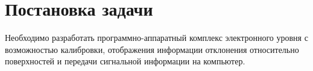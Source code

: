 \documentclass[document.tex]{subfiles}
\begin{document}
\section{Постановка задачи}
\noindent
Необходимо разработать программно-аппаратный комплекс электронного уровня с
возможностью калибровки, отображения информации отклонения относительно
поверхностей и передачи сигнальной информации на компьютер.
\end{document}
